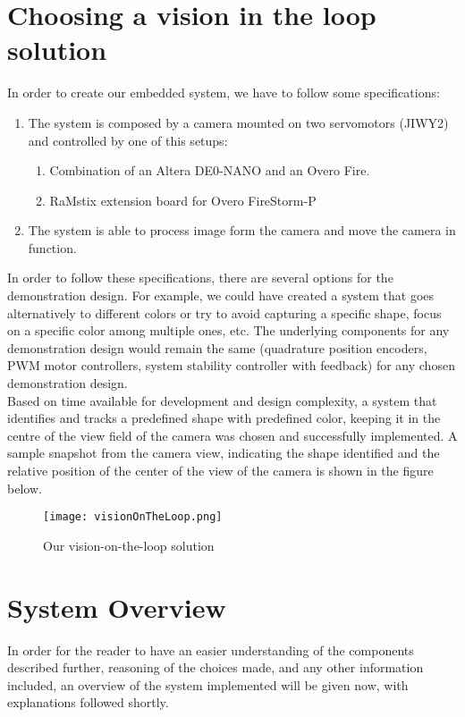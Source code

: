 \newpage
\section{Choosing a vision in the loop solution}

In order to create our embedded system, we have to follow some specifications: 

\begin{enumerate}
 \item The system is composed by a camera mounted on two servomotors (JIWY2) and controlled by one of this setups:
 \begin{enumerate}
  \item Combination of an Altera DE0-NANO and an Overo Fire.
  \item RaMstix extension board for Overo FireStorm-P
 \end{enumerate}
 \item The system is able to process image form the camera and move the camera in function.
\end{enumerate}

In order to follow these specifications, there are several options for the demonstration design. For example, we could have created a system that goes alternatively to different colors or try to avoid capturing a specific shape, focus on a specific color among multiple ones, etc. The underlying components for any demonstration design would remain the same (quadrature position encoders, PWM motor controllers, system stability controller with feedback) for any chosen demonstration design.\\

Based on time available for development and design complexity, a system that identifies and tracks a predefined shape with predefined color, keeping it in the centre of the view field of the camera was chosen and successfully implemented. A sample snapshot from the camera view, indicating the shape identified and the relative position of the center of the view of the camera is shown in the figure below.

\begin{figure}[!ht]
\centering
 \texttt{[image: visionOnTheLoop.png]}
 \caption{Our vision-on-the-loop solution}
 \label{votl}
\end{figure}


\section{System Overview}
In order for the reader to have an easier understanding of the components described further, reasoning of the choices made, and any other information included, an overview of the system implemented will be given now, with explanations followed shortly.

